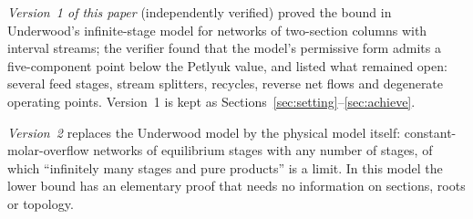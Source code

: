 \emph{Version~1 of this paper} (independently verified) proved the bound in Underwood's infinite-stage model for networks
of two-section columns with interval streams; the verifier found that the model's permissive form admits a
five-component point below the Petlyuk value, and listed what remained open: several feed stages, stream splitters,
recycles, reverse net flows and degenerate operating points. Version~1 is kept as
Sections~\ref{sec:setting}--\ref{sec:achieve}.

\emph{Version~2} replaces the Underwood model by the physical model itself: constant-molar-overflow networks of
equilibrium stages with any number of stages, of which ``infinitely many stages and pure products'' is a limit. In
this model the lower bound has an elementary proof that needs no information on sections, roots or topology.

